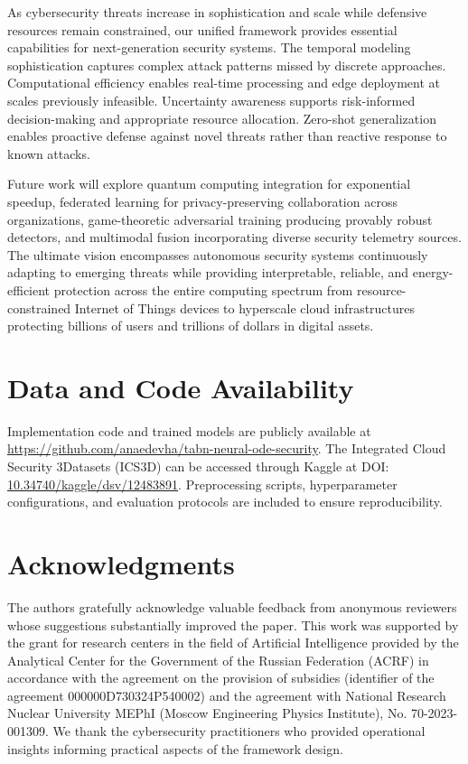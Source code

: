 \documentclass[10pt,journal,compsoc]{IEEEtran}
\begin{document}
As cybersecurity threats increase in sophistication and scale while defensive resources remain constrained, our unified framework provides essential capabilities for next-generation security systems. The temporal modeling sophistication captures complex attack patterns missed by discrete approaches. Computational efficiency enables real-time processing and edge deployment at scales previously infeasible. Uncertainty awareness supports risk-informed decision-making and appropriate resource allocation. Zero-shot generalization enables proactive defense against novel threats rather than reactive response to known attacks.

Future work will explore quantum computing integration for exponential speedup, federated learning for privacy-preserving collaboration across organizations, game-theoretic adversarial training producing provably robust detectors, and multimodal fusion incorporating diverse security telemetry sources. The ultimate vision encompasses autonomous security systems continuously adapting to emerging threats while providing interpretable, reliable, and energy-efficient protection across the entire computing spectrum from resource-constrained Internet of Things devices to hyperscale cloud infrastructures protecting billions of users and trillions of dollars in digital assets.

\section*{Data and Code Availability}

Implementation code and trained models are publicly available at \url{https://github.com/anaedevha/tabn-neural-ode-security}. The Integrated Cloud Security 3Datasets (ICS3D) can be accessed through Kaggle at DOI: \href{https://doi.org/10.34740/kaggle/dsv/12483891}{10.34740/kaggle/dsv/12483891}. Preprocessing scripts, hyperparameter configurations, and evaluation protocols are included to ensure reproducibility.

\section*{Acknowledgments}

The authors gratefully acknowledge valuable feedback from anonymous reviewers whose suggestions substantially improved the paper. This work was supported by the grant for research centers in the field of Artificial Intelligence provided by the Analytical Center for the Government of the Russian Federation (ACRF) in accordance with the agreement on the provision of subsidies (identifier of the agreement 000000D730324P540002) and the agreement with National Research Nuclear University MEPhI (Moscow Engineering Physics Institute), No. 70-2023-001309. We thank the cybersecurity practitioners who provided operational insights informing practical aspects of the framework design.
\end{document}
